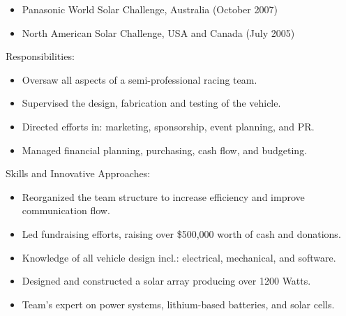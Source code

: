 \begin{entrylist}
{  \begin{itemize}
    \item Panasonic World Solar Challenge, Australia (October 2007)
    \item North American Solar Challenge, USA and Canada (July 2005)
  \end{itemize}
  Responsibilities:
  \begin{itemize}
    \item Oversaw all aspects of a semi-professional racing team.
    \item Supervised the design, fabrication and testing of the vehicle.
    \item Directed efforts in: marketing, sponsorship, event planning, and PR.
    \item Managed financial planning, purchasing, cash flow, and budgeting.
  \end{itemize}
  Skills and Innovative Approaches:
  \begin{itemize}
    \item Reorganized the team structure to increase efficiency and improve communication flow.
    \item Led fundraising efforts, raising over \$500,000 worth of cash and donations.
    \item Knowledge of all vehicle design incl.: electrical, mechanical, and software.
    \item Designed and constructed a solar array producing over 1200 Watts.
    \item Team’s expert on power systems, lithium-based batteries, and solar cells.
  \end{itemize}
}
\end{entrylist}